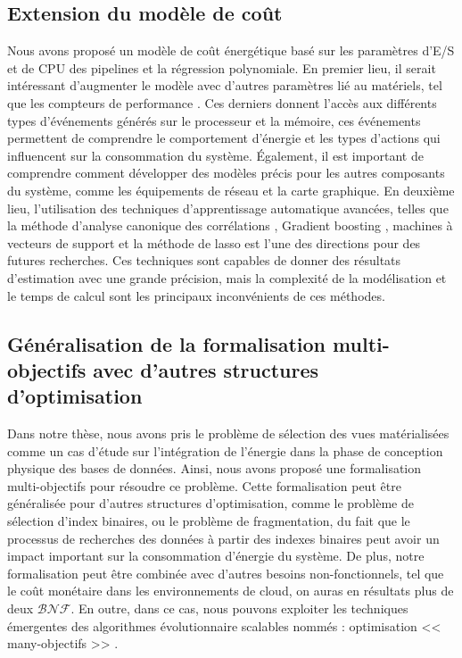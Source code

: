 \subsection{Extension du modèle de coût}
Nous avons proposé un modèle de coût énergétique basé sur les paramètres d'E/S et de CPU des pipelines et la régression polynomiale. En premier lieu, il serait intéressant d'augmenter le modèle avec d'autres paramètres lié au matériels, tel que les compteurs de performance \cite{Contreras05}. Ces derniers donnent l'accès aux différents types d'événements générés sur le processeur et la mémoire, ces événements permettent de comprendre le comportement d'énergie et les types d'actions qui influencent sur la consommation du système. Également, il est important de comprendre comment développer des modèles précis pour les autres composants du système, comme les équipements de réseau et la carte graphique. En deuxième lieu, l'utilisation des techniques d'apprentissage automatique avancées, telles que la méthode d'analyse canonique des corrélations \cite{Ganapathi09}, Gradient boosting \cite{Li12a,Konig11}, machines à vecteurs de support \cite{Akdere12} et la méthode de lasso \cite{Zheng15} est l'une des directions pour des futures recherches. Ces techniques sont capables de donner des résultats d'estimation avec une grande précision, mais la complexité de la modélisation et le temps de calcul sont les principaux inconvénients de ces méthodes. 
 
\subsection{Généralisation de la formalisation multi-objectifs avec d'autres structures d'optimisation}
Dans notre thèse, nous avons pris le problème de sélection des vues matérialisées comme un cas d'étude sur l'intégration de l'énergie dans la phase de conception physique des bases de données. Ainsi, nous avons proposé une formalisation multi-objectifs pour résoudre ce problème. Cette formalisation peut être généralisée pour d'autres structures d'optimisation, comme le problème de sélection d'index binaires, ou le problème de fragmentation, du fait que le processus de recherches des données à partir des indexes binaires peut avoir un impact important sur la consommation d'énergie du système. De plus, notre formalisation peut être combinée avec d'autres besoins non-fonctionnels, tel que le coût monétaire dans les environnements de cloud, on auras en résultats plus de deux $\mathcal{BNF}$. En outre, dans ce cas, nous pouvons exploiter les techniques émergentes des algorithmes évolutionnaire scalables nommés : optimisation << many-objectifs >> \cite{Chand15}.

